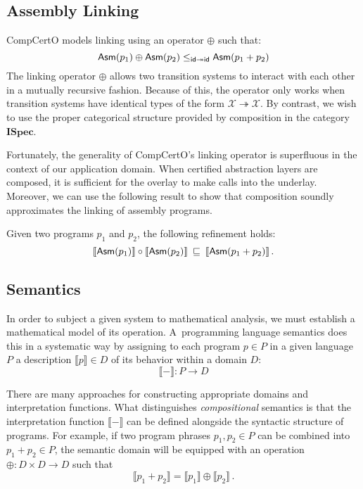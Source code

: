 \documentclass[acmsmall,review,anonymous]{acmart}\settopmatter{printfolios=true,printccs=false,printacmref=false}
\newcommand{\ISpec}{\mathbf{ISpec}}
\begin{document}
\subsection*{Assembly Linking}

CompCertO models linking using an operator $\oplus$
such that:
\[
   \mathsf{Asm} (p_1) \oplus  \mathsf{Asm} (p_2)
  \le_{ \mathsf{id}  \twoheadrightarrow  \mathsf{id} }
   \mathsf{Asm} (p_1 + p_2)
\]
The linking operator $\oplus$ allows
two transition systems to interact with each other
in a mutually recursive fashion.
Because of this,
the operator only works when transition systems
have identical types of the form $\mathcal{X} \twoheadrightarrow \mathcal{X}$.
By contrast,
we wish to use the proper categorical structure
provided by composition in the category $\ISpec$.

Fortunately,
the generality of CompCertO's linking operator is superfluous
in the context of our application domain.
When certified abstraction layers are composed,
it is sufficient for the overlay to make calls into the underlay.
Moreover,
we can use the following result
to show that composition soundly approximates
the linking of assembly programs.

\begin{lemma}
Given two  programs $p_1$ and $p_2$,
the following refinement holds:
\[
  \llbracket  \mathsf{Asm} (p_1) \rrbracket \circ
  \llbracket  \mathsf{Asm} (p_2) \rrbracket \:\sqsubseteq\:
  \llbracket  \mathsf{Asm} (p_1 + p_2) \rrbracket
  \,.
\]
\end{lemma}

\subsection{Semantics} %

In order to subject a given system to mathematical analysis,
we must establish a mathematical model of its operation.
A~programming language semantics
does this in a systematic way
by assigning to each program $p \in P$
in a given language $P$
a description $\llbracket p \rrbracket \in D$
of its behavior within a domain $D$:
\[
    \llbracket {-} \rrbracket : P \rightarrow D
\]

There are many approaches
for constructing appropriate domains
and interpretation functions.
What distinguishes \emph{compositional} semantics
is that the interpretation function $\llbracket - \rrbracket$
can be defined alongside the syntactic structure of programs.
For example,
if two program phrases $p_1, p_2 \in P$
can be combined into $p_1 + p_2 \in P$,
the semantic domain will be equipped with an operation
$\oplus : D \times D \rightarrow D$
such that
\[
  \llbracket p_1 + p_2 \rrbracket =
  \llbracket p_1 \rrbracket \oplus
  \llbracket p_2 \rrbracket
  \,.
\]
\end{document}
